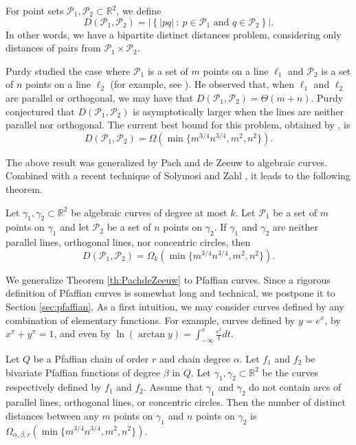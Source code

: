 \documentclass[11pt]{article}
\theoremstyle{definition}
\newcommand{\RR}{\mathbb R}
\newcommand{\pts}{\mathcal{P}}
\begin{document}
For point sets $\pts_1,\pts_2\subset \RR^2$, we define
%
\[ D(\pts_1,\pts_2)= \left|\left\{|pq|\ :\ p\in \pts_1 \text{ and } q\in \pts_2 \right\}\right|. \] 
%
In other words, we have a bipartite distinct distances problem, considering only distances of pairs from $\pts_1\times\pts_2$.

Purdy studied the case where $\pts_1$ is a set of $m$ points on a line $\ell_1$ and $\pts_2$ is a set of $n$ points on a line $\ell_2$ (for example, see \cite[Section 5.5]{BMP05}).
He observed that, when $\ell_1$ and $\ell_2$ are parallel or orthogonal, we may have that $D(\pts_1,\pts_2)=\Theta(m+n)$.
Purdy conjectured that $D(\pts_1,\pts_2)$ is asymptotically larger when the lines are neither parallel nor orthogonal.
The current best bound for this problem, obtained by \cite{SSS13,SolyZahl24}, is
%
\[ D(\pts_1,\pts_2) = \Omega\left(\min\{m^{3/4}n^{3/4},m^2,n^2\}\right). \] 

The above result was generalized by Pach and de Zeeuw \cite{PachDZ17} to algebraic curves. 
Combined with a recent technique of Solymosi and Zahl \cite{SolyZahl24}, it leads to the following theorem.

\begin{theorem} \label{th:PachdeZeeuw}
Let $\gamma_1,\gamma_2\subset\RR^2$ be algebraic curves of degree at most $k$.
Let $\pts_1$ be a set of $m$ points on $\gamma_1$ and let $\pts_2$ be a set of $n$ points on $\gamma_2$.
If $\gamma_1$ and $\gamma_2$ are neither parallel lines, orthogonal lines, nor concentric circles, then
%
\[  D(\pts_1,\pts_2) = \Omega_k(\min\{m^{3/4}n^{3/4},m^2,n^2\}).\]
% 
\end{theorem}

We generalize Theorem \ref{th:PachdeZeeuw} to Pfaffian curves. 
Since a rigorous definition of Pfaffian curves is somewhat long and technical, we postpone it to  Section \ref{sec:pfaffian}. 
As a first intuition, we may consider curves defined by any combination of elementary functions. For example, curves defined by $y=e^x$, by $x^\pi + y^\pi= 1$, and even by $\ln (\arctan y) = \int_{-\infty}^x \frac{e^t}{t}dt$. 
  
\begin{theorem}[store=thtwocurves]
\label{th:twocurves}
Let $Q$ be a Pfaffian chain of order $r$ and chain degree $\alpha$. 
Let $f_1$ and $f_2$ be bivariate Pfaffian functions of degree $\beta$ in $Q$. 
Let $\gamma_1,\gamma_2\subset \RR^2$ be the curves respectively defined by $f_1$ and $f_2$. 
Assume that $\gamma_1$ and $\gamma_2$ do not contain arcs of parallel lines, orthogonal lines, or concentric circles.
Then the number of distinct distances between any $m$ points on $\gamma_1$ and $n$ points on $\gamma_2$ is $\Omega_{\alpha,\beta,r}(\min\{m^{3/4}n^{3/4}, m^2, n^2\})$. 
\end{theorem}
\end{document}
